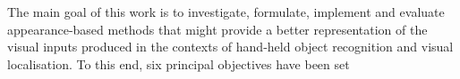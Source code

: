 The main goal of this work is to investigate, formulate, implement and evaluate appearance-based methods that might provide a better representation of the visual inputs produced in the contexts of hand-held object recognition and visual localisation. To this end, six principal objectives have been set

%
%



